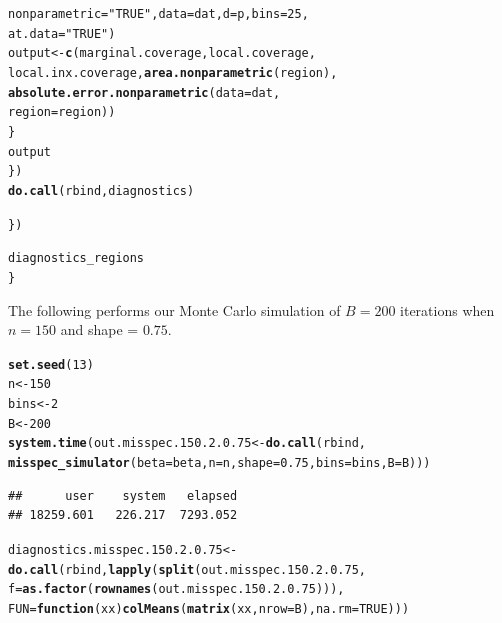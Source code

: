 \documentclass[11pt]{article}\usepackage[]{graphicx}\usepackage[]{color}
\makeatletter
\newcommand{\hlnum}[1]{\textcolor[rgb]{0.686,0.059,0.569}{#1}}%
\newcommand{\hlstr}[1]{\textcolor[rgb]{0.192,0.494,0.8}{#1}}%
\newcommand{\hlstd}[1]{\textcolor[rgb]{0.345,0.345,0.345}{#1}}%
\newcommand{\hlkwa}[1]{\textcolor[rgb]{0.161,0.373,0.58}{\textbf{#1}}}%
\newcommand{\hlkwb}[1]{\textcolor[rgb]{0.69,0.353,0.396}{#1}}%
\newcommand{\hlkwc}[1]{\textcolor[rgb]{0.333,0.667,0.333}{#1}}%
\newcommand{\hlkwd}[1]{\textcolor[rgb]{0.737,0.353,0.396}{\textbf{#1}}}%
\newenvironment{kframe}{%
 \def\at@end@of@kframe{}%
 \ifinner\ifhmode%
  \def\at@end@of@kframe{\end{minipage}}%
  \begin{minipage}{\columnwidth}%
 \fi\fi%
 \def\FrameCommand##1{\hskip\@totalleftmargin \hskip-\fboxsep
 \colorbox{shadecolor}{##1}\hskip-\fboxsep
     \hskip-\linewidth \hskip-\@totalleftmargin \hskip\columnwidth}%
 \MakeFramed {\advance\hsize-\width
   \@totalleftmargin\z@ \linewidth\hsize
   \@setminipage}}%
 {\par\unskip\endMakeFramed%
 \at@end@of@kframe}
\newenvironment{knitrout}{}{} %
\makeatother
\begin{document}
\begin{knitrout}
\begin{kframe}
\begin{alltt}
          \hlkwc{nonparametric} \hlstd{=} \hlstr{"TRUE"}\hlstd{,} \hlkwc{data} \hlstd{= dat,} \hlkwc{d} \hlstd{= p,} \hlkwc{bins} \hlstd{=} \hlnum{25}\hlstd{,}
          \hlkwc{at.data} \hlstd{=} \hlstr{"TRUE"}\hlstd{)}
        \hlstd{output} \hlkwb{<-} \hlkwd{c}\hlstd{(marginal.coverage, local.coverage,}
          \hlstd{local.inx.coverage,} \hlkwd{area.nonparametric}\hlstd{(region),}
          \hlkwd{absolute.error.nonparametric}\hlstd{(}\hlkwc{data} \hlstd{= dat,}
            \hlkwc{region} \hlstd{= region))}
      \hlstd{\}}
      \hlstd{output}
    \hlstd{\})}
    \hlkwd{do.call}\hlstd{(rbind, diagnostics)}

  \hlstd{\})}

  \hlstd{diagnostics_regions}
\hlstd{\}}
\end{alltt}
\end{kframe}
\end{knitrout}



The following performs our Monte Carlo simulation of $B = 200$ iterations 
when $n = 150$ and shape = $0.75$.

\begin{knitrout}
\color{fgcolor}\begin{kframe}
\begin{alltt}
\hlkwd{set.seed}\hlstd{(}\hlnum{13}\hlstd{)}
\hlstd{n} \hlkwb{<-} \hlnum{150}
\hlstd{bins} \hlkwb{<-} \hlnum{2}
\hlstd{B} \hlkwb{<-} \hlnum{200}
\hlkwd{system.time}\hlstd{(out.misspec.150.2.0.75} \hlkwb{<-} \hlkwd{do.call}\hlstd{(rbind,}
  \hlkwd{misspec_simulator}\hlstd{(}\hlkwc{beta} \hlstd{= beta,} \hlkwc{n} \hlstd{= n,} \hlkwc{shape} \hlstd{=} \hlnum{0.75}\hlstd{,} \hlkwc{bins} \hlstd{= bins,} \hlkwc{B} \hlstd{= B)))}
\end{alltt}
\begin{verbatim}
##      user    system   elapsed 
## 18259.601   226.217  7293.052
\end{verbatim}
\begin{alltt}
\hlstd{diagnostics.misspec.150.2.0.75} \hlkwb{<-} \hlkwd{do.call}\hlstd{(rbind,} \hlkwd{lapply}\hlstd{(}\hlkwd{split}\hlstd{(out.misspec.150.2.0.75,}
  \hlkwc{f} \hlstd{=} \hlkwd{as.factor}\hlstd{(}\hlkwd{rownames}\hlstd{(out.misspec.150.2.0.75))),}
  \hlkwc{FUN} \hlstd{=} \hlkwa{function}\hlstd{(}\hlkwc{xx}\hlstd{)} \hlkwd{colMeans}\hlstd{(}\hlkwd{matrix}\hlstd{(xx,} \hlkwc{nrow} \hlstd{= B),} \hlkwc{na.rm} \hlstd{=} \hlnum{TRUE}\hlstd{)))}
\end{alltt}
\end{kframe}
\end{knitrout}
\end{document}
